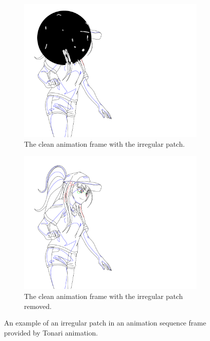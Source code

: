 \begin{figure}
    \centering
    \begin{subfigure}{.45\textwidth}
        \includegraphics[width=\textwidth]{graphics/douga/007AD_DOU_3.pdf}
        \caption{The clean animation frame with the irregular patch.}
    \end{subfigure}
    \begin{subfigure}{.45\textwidth}
        \includegraphics[width=\textwidth]{graphics/douga/007AD_DOU_3_nopatch.pdf}
        \caption{The clean animation frame with the irregular patch removed.}
    \end{subfigure}
    \caption{An example of an irregular patch in an animation sequence frame provided by Tonari animation.}
    \label{fig:patch.example}
\end{figure}

